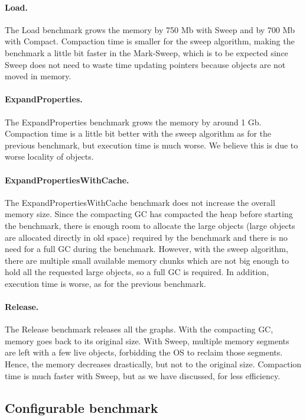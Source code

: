\documentclass[10pt, sigplan]{acmart}
\begin{document}
\paragraph{Load.} The Load benchmark grows the memory by 750 Mb with Sweep and by 700 Mb with Compact. Compaction time is smaller for the sweep algorithm, making the benchmark a little bit faster in the Mark-Sweep, which is to be expected since Sweep does not need to waste time updating pointers because objects are not moved in memory.

\paragraph{ExpandProperties.} The ExpandProperties benchmark grows the memory by around 1 Gb. Compaction time is a little bit better with the sweep algorithm as for the previous benchmark, but execution time is much worse. We believe this is due to worse locality of objects.

\paragraph{ExpandPropertiesWithCache.} The ExpandPropertiesWithCache benchmark does not increase the overall memory size. Since the compacting GC has compacted the heap before starting the benchmark, there is enough room to allocate the large objects (large objects are allocated directly in old space) required by the benchmark and there is no need for a full GC during the benchmark. However, with the sweep algorithm, there are multiple small available memory chunks which are not big enough to hold all the requested large objects, so a full GC is required. In addition, execution time is worse, as for the previous benchmark.

\paragraph{Release.} The Release benchmark releases all the graphs. With the compacting GC, memory goes back to its original size. With Sweep, multiple memory segments are left with a few live objects, forbidding the OS to reclaim those segments. Hence, the memory decreases drastically, but not to the original size. Compaction time is much faster with Sweep, but as we have discussed, for less efficiency.

\subsection{Configurable benchmark}
\end{document}
